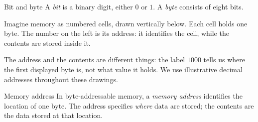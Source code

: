 \documentclass[a4paper,12pt,oneside]{report}
\begin{document}
\begin{frameddefn}{Bit and byte}\label{def:bit-byte}
A \emph{bit} is a binary digit, either $0$ or $1$.
A \emph{byte} consists of eight bits.
\end{frameddefn}

Imagine memory as numbered cells, drawn vertically below. Each cell
holds one byte. The number on the left is its address: it identifies
the cell, while the contents are stored inside it.
\begin{center}
\end{center}
The address and the contents are different things: the label $1000$
tells us where the first displayed byte is, not what value it holds.
We use illustrative decimal addresses throughout these drawings.

\begin{frameddefn}{Memory address}\label{def:memory-address}
In byte-addressable memory, a \emph{memory address} identifies the
location of one byte. The address specifies \emph{where} data are
stored; the contents are the data stored at that location.
\end{frameddefn}
\end{document}
